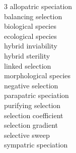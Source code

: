 
\begin{multicols}{3}
allopatric speciation \\
balancing selection \\
biological species \\
ecological species \\
hybrid inviability \\
hybrid sterility \\
linked selection \\
morphological species \\
negative selection \\
parapatric speciation \\
purifying selection \\
selection coefficient \\
selection gradient \\
selective sweep \\
sympatric speciation 
\end{multicols}
